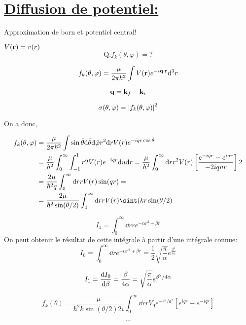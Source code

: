 \section*{ \underline{Diffusion de potentiel:} }
Approximation de born et potentiel central!

$V (\vb{r}) = v(r)$ 
$$\text{Q:} f_k (\theta, \varphi) = ? $$ 

$$f_k (\theta, \varphi) = \frac{\mu}{2\pi\hbar^2} \int V(\vb{r}) e^{-i \vb{q} \cdot \vb{r}} \dd^3 r$$ 

$$\vb{q} = \vb{k}_f -\vb{k}_i$$ 

$$\sigma(\theta, \varphi) = \abs{f_k (\theta, \varphi)}^{2}$$ 

On a donc,

$$\begin{aligned}
	f_k (\theta, \varphi) &= \frac{\mu}{2\pi\hbar^2} \int \sin\tilde\theta \dd \tilde \theta \dd \tilde\varphi r^2 \dd r V(r) e^{-iqr \cos \tilde\theta}\\ &= \frac{\mu}{\hbar^2} \int_0^\infty\int_{-1}^{1}r2V(r) e^{-iqr} \dd u\dd r = \frac{\mu}{\hbar^2} \int_0^{\infty}\dd r r^2 V(r) \left[ \frac{e^{-iqr} - e^{iqr}}{-2iqur}  \right] 2  \\ &= \frac{2\mu}{\hbar^2q} \int_0^{\infty}\dd r r V(r) \sin(qr) = \\ &= \frac{2\mu}{\hbar^2\sin(\theta/2)} \int_0^{\infty}\dd r r V(r) \sint(kr\sin(\theta/2) 
\end{aligned}$$ 

\begin{tcolorbox}[title=Intégrale commune]
	 	$$I_1 = \int_0^{\infty}\dd r r e^{-\alpha r^2 + \beta r} $$
On peut obtenir le résultat de cette intégrale à partir d'une intégrale connue:
		$$I_0 =\int_0^{\infty}\dd r e^{-\alpha r^2 + \beta r} = \frac{1}{2} \sqrt{\frac{\pi}{\alpha} }e^{\frac{\beta^2}{4\alpha} }$$ 

$$I_1 = \dv{I_0}{\beta} = \frac{\beta}{4\alpha} = \sqrt{\frac{\pi}{\alpha} } e^{\beta^2/4\alpha} $$ 

\end{tcolorbox}

$$f_k (\theta) = \frac{\mu}{\hbar^2 k \sin(\theta/2) 2i}\int_0^{\infty} \dd r r V_0 e^{-r^2/a^2} \left[ e^{iqr} - e^{-iqr} \right] $$ 

$$\dotsb$$ 









